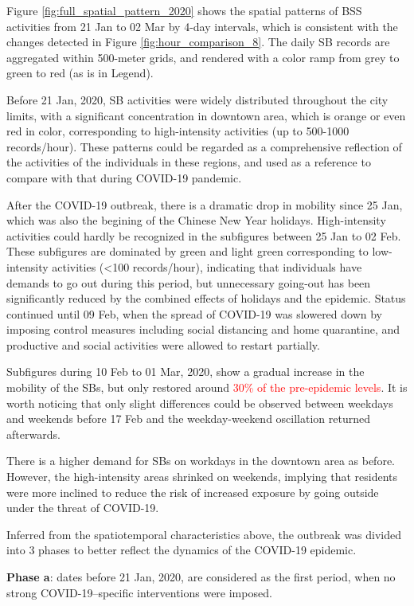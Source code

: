 \documentclass[preprints,ijgi,submit,moreauthors]{Definitions/mdpi}
\begin{document}
Figure \ref{fig:full_spatial_pattern_2020} shows the spatial patterns of BSS activities from 21 Jan to 02 Mar by 4-day intervals, which is consistent with the changes detected in Figure \ref{fig:hour_comparison_8}. %
The daily SB records are aggregated within 500-meter grids, and rendered with a color ramp from grey to green to red (as is in Legend).

Before 21 Jan, 2020, SB activities were widely distributed throughout the city limits, with a significant concentration in downtown area, which is orange or even red in color, corresponding to high-intensity activities (up to 500-1000 records/hour).
These patterns could be regarded as a comprehensive reflection of the activities of the individuals in these regions, and used as a reference to compare with that during COVID-19 pandemic.

After the COVID-19 outbreak, there is a dramatic drop in mobility since 25 Jan, which was also the begining of the Chinese New Year holidays.
High-intensity activities could hardly be recognized in the subfigures between 25 Jan to 02 Feb. 
These subfigures are dominated by green and light green corresponding to low-intensity activities (<100 records/hour), indicating that individuals have demands to go out during this period, but unnecessary going-out has been significantly reduced by the combined effects of holidays and the epidemic.
Status continued until 09 Feb, when the spread of COVID-19 was slowered down by imposing control measures including social distancing and home quarantine, and productive and social activities were allowed to restart partially.

Subfigures during 10 Feb to 01 Mar, 2020, show a gradual increase in the mobility of the SBs, but only restored around \textcolor{red}{30\% of the pre-epidemic levels}.
It is worth noticing that only slight differences could be observed between weekdays and weekends before 17 Feb and the weekday-weekend oscillation returned afterwards.

There is a higher demand for SBs on workdays in the downtown area as before.
However, the high-intensity areas shrinked on weekends, implying that residents were more inclined to reduce the risk of increased exposure by going outside under the threat of COVID-19. 

Inferred from the spatiotemporal characteristics above, the outbreak was divided into 3 phases to better reflect the dynamics of the COVID-19 epidemic.

\textbf{Phase a}: dates before 21 Jan, 2020, are considered as the first period, when no strong COVID-19–specific interventions were imposed.
\end{document}
